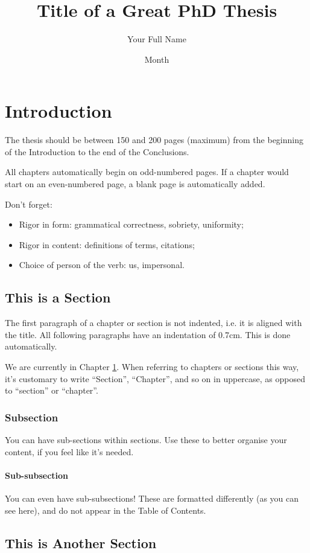 \documentclass[12pt,reqno,twoside]{amsbook}
\title{Title of a Great PhD Thesis}
\author{Your Full Name}
\date{Month}{Year}
\begin{document}
\chapter{Introduction}\label{ch:introduction}
The thesis should be between 150 and 200 pages (maximum) from the beginning of the Introduction to the end of the Conclusions.

All chapters automatically begin on odd-numbered pages. If a chapter would start on an even-numbered page, a blank page is automatically added.

Don't forget:
\begin{itemize}
    \item Rigor in form: grammatical correctness, sobriety, uniformity;
    \item Rigor in content: definitions of terms, citations;
    \item Choice of person of the verb: us, impersonal.
\end{itemize}


\section{This is a Section}\label{sec:example_section}
The first paragraph of a chapter or section is not indented, i.e. it is aligned with the title. All following paragraphs have an indentation of 0.7cm. This is done automatically.

We are currently in Chapter \ref{ch:introduction}. When referring to chapters or sections this way, it's customary to write ``Section'', ``Chapter'', and so on in uppercase, as opposed to ``section'' or ``chapter''.

\subsection{Subsection}
You can have sub-sections within sections. Use these to better organise your content, if you feel like it's needed.

\subsubsection{Sub-subsection}
You can even have sub-subsections! These are formatted differently (as you can see here), and do not appear in the Table of Contents.

\section{This is Another Section}
\end{document}
